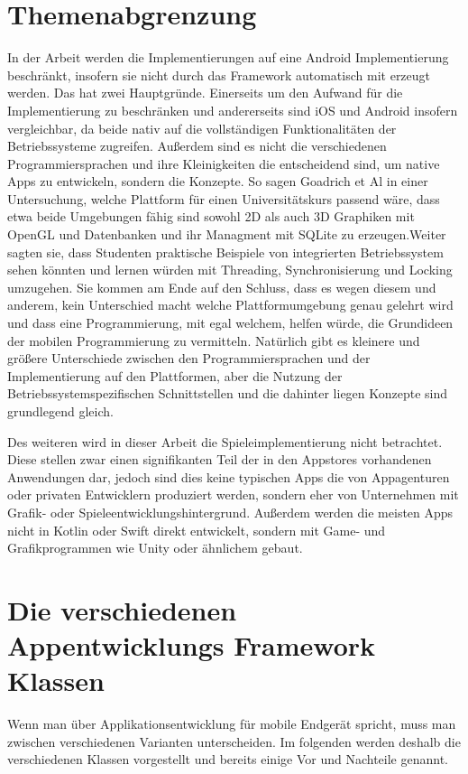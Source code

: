 \section{Themenabgrenzung}
In der Arbeit werden die Implementierungen auf eine Android Implementierung beschränkt, insofern sie nicht durch das Framework automatisch mit erzeugt werden. 
Das hat zwei Hauptgründe. Einerseits um den Aufwand für die Implementierung zu beschränken und andererseits sind iOS und Android insofern vergleichbar, da beide nativ auf die vollständigen Funktionalitäten der Betriebssysteme zugreifen. Außerdem sind es nicht die verschiedenen Programmiersprachen und ihre Kleinigkeiten die entscheidend sind, um native Apps zu entwickeln, sondern die Konzepte. So sagen Goadrich et Al in einer Untersuchung, welche Plattform für einen Universitätskurs passend wäre, dass etwa beide Umgebungen fähig sind sowohl 2D als auch 3D Graphiken mit OpenGL und Datenbanken und ihr Managment mit SQLite zu erzeugen.\cite{iOSvsAndroid}Weiter sagten sie, dass Studenten praktische Beispiele von integrierten Betriebssystem sehen könnten und lernen würden mit Threading, Synchronisierung und Locking umzugehen\cite{iOSvsAndroid}. Sie kommen am Ende auf den Schluss, dass es wegen diesem und anderem, kein Unterschied macht welche Plattformumgebung genau gelehrt wird und dass eine Programmierung, mit egal welchem, helfen würde, die Grundideen der mobilen Programmierung zu vermitteln. \cite{iOSvsAndroid}
Natürlich gibt es kleinere und größere Unterschiede zwischen den Programmiersprachen und der Implementierung auf den Plattformen, aber die Nutzung der Betriebssystemspezifischen Schnittstellen und die dahinter liegen Konzepte sind grundlegend gleich.

Des weiteren wird in dieser Arbeit die Spieleimplementierung nicht betrachtet. Diese stellen zwar einen signifikanten Teil der in den Appstores vorhandenen Anwendungen dar, jedoch sind dies keine typischen Apps die von Appagenturen oder privaten Entwicklern produziert werden, sondern eher von Unternehmen mit Grafik- oder Spieleentwicklungshintergrund. Außerdem werden die meisten Apps nicht in Kotlin oder Swift direkt entwickelt, sondern mit Game- und Grafikprogrammen wie Unity oder ähnlichem gebaut. 
\newpage

\section{Die verschiedenen Appentwicklungs Framework Klassen}
Wenn man über Applikationsentwicklung für mobile Endgerät spricht, muss man zwischen verschiedenen Varianten unterscheiden. Im folgenden werden deshalb die verschiedenen Klassen vorgestellt und bereits einige Vor und Nachteile genannt.
